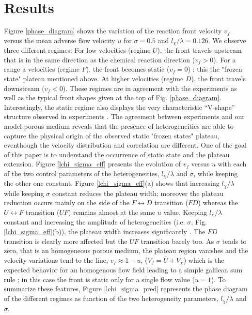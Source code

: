 \documentclass[doublecol]{epl2}
\begin{document}
\section{Results}
Figure \ref{phase_diagram} shows the variation of the reaction front velocity $v_f$  versus the mean adverse flow velocity $u$  for $\sigma=0.5$ and $l_\chi / \lambda = 0.126 $. We observe three different regimes: For low velocities (regime $U$), the front travels upstream that is in the same direction as the chemical reaction direction ($v_f>0$).
For a range a velocities (regime $F$), the front becomes static ($v_f=0$) : this the "frozen state" plateau mentioned above. At higher velocities (regime $D$), the front travels downstream ($v_f<0$). These regimes are in agreement with the experiments \cite{atis12} as well as the typical front shapes given at the top of Fig. \ref{phase_diagram}. Interestingly, the static regime also  displays the very characteristic ``V-shape'' structure observed in experiments \cite{atis12b}.
The agreement between experiments and our model porous medium reveals that the presence of heterogeneities are able to capture the physical origin of the observed static "frozen states" plateau, eventhough the velocity distribution and correlation are different.
One of the goal of this paper is to understand the occurrence of static state and the plateau extension.
Figure \ref{lchi_sigma_eff} presents the evolution of $v_f$ versus $u$  with each of the two control parameters of the heterogeneities,  $l_{\chi}/\lambda$ and $\sigma$, while keeping the other one constant.
Figure \ref{lchi_sigma_eff}(a) shows that increasing $l_\chi/\lambda$ while keeping  $\sigma$ constant reduces the plateau width; moreover the plateau reduction occurs mainly on the side of the $F \leftrightarrow D$ transition ($FD$) whereas the $U \leftrightarrow F$ transition  ($UF$) remains almost at the same $u$ value.
 Keeping $l_\chi/\lambda$ constant and increasing the amplitude of heterogeneities (i.e. $\sigma$, Fig. \ref{lchi_sigma_eff}(b)), the plateau width increases significantly . The $FD$ transition is clearly more affected but the $UF$ transition barely too. As $\sigma$ tends to zero, that is an homogeneous porous medium, the plateau region vanishes and the velocity variations tend to the line, $v_f \approx 1-u$,  ($V_f=\overline{U}+V_{\chi}$) which is the expected behavior for an homogenous flow field leading to a simple galilean sum rule \cite{edwards02,leconte03}; in this case the front is static only for a single flow value ($u=1$). To summarize these features, Figure \ref{lchi_sigma_pred} represents the phase diagram of the different regimes as function of the two heterogeneity parameters,  $l_{\chi}/\lambda$ and $\sigma$.
\end{document}
